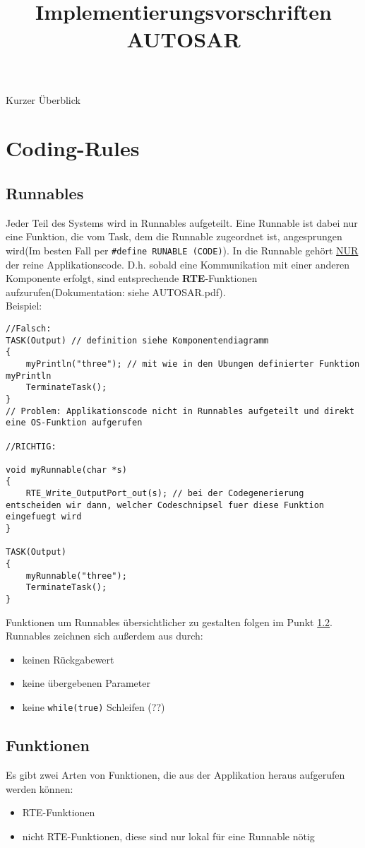\documentclass[]{scrartcl}
\title{Implementierungsvorschriften AUTOSAR}
\author{}
\newcommand{\DokAutosar}{AUTOSAR.pdf}
\begin{document}
\maketitle

Kurzer Überblick

\section{Coding-Rules}
\label{sec:Coding-Rules}
\subsection{Runnables}
\label{sbsec:Runnables}
Jeder Teil des Systems wird in Runnables aufgeteilt. Eine Runnable ist dabei nur eine Funktion, die vom Task, dem die Runnable zugeordnet ist, angesprungen wird(Im besten Fall per \lstinline{#define RUNABLE (CODE)}). In die Runnable gehört \underline{NUR} der reine Applikationscode. D.h. sobald eine Kommunikation mit einer anderen Komponente erfolgt, sind entsprechende \textbf{RTE}-Funktionen aufzurufen(Dokumentation: siehe \DokAutosar).\\
Beispiel:
\begin{lstlisting}
//Falsch:
TASK(Output) // definition siehe Komponentendiagramm
{
	myPrintln("three"); // mit wie in den Ubungen definierter Funktion myPrintln
	TerminateTask();
}
// Problem: Applikationscode nicht in Runnables aufgeteilt und direkt eine OS-Funktion aufgerufen

//RICHTIG:

void myRunnable(char *s)
{
	RTE_Write_OutputPort_out(s); // bei der Codegenerierung entscheiden wir dann, welcher Codeschnipsel fuer diese Funktion eingefuegt wird
}

TASK(Output)
{
	myRunnable("three");
	TerminateTask();
}
\end{lstlisting}
Funktionen um Runnables übersichtlicher zu gestalten folgen im Punkt \ref{sbsec:Funktionen}. Runnables zeichnen sich außerdem aus durch:
\begin{itemize}
\item keinen Rückgabewert
\item keine übergebenen Parameter
\item keine \lstinline|while(true)| Schleifen (??)
\end{itemize}

\subsection{Funktionen}
\label{sbsec:Funktionen}
Es gibt zwei Arten von Funktionen, die aus der Applikation heraus aufgerufen werden können:
\begin{itemize}
\item RTE-Funktionen
\item nicht RTE-Funktionen, diese sind nur lokal für eine Runnable nötig
\end{itemize}
\end{document}
